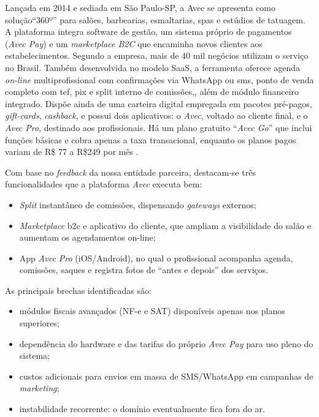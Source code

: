 Lançada em 2014 e sediada em São Paulo-SP, a Avec se apresenta como solução``360º'' para salões, barbearias, esmaltarias, spas e estúdios de tatuagem. A plataforma integra software de gestão, um sistema próprio de pagamentos (\emph{Avec Pay}) e um \emph{marketplace B2C} que encaminha novos clientes aos estabelecimentos. Segundo a empresa, mais de 40 mil negócios utilizam o serviço no
Brasil. Também desenvolvida no modelo SaaS, a ferramenta oferece agenda \emph{on-line} multiprofissional com confirmações via WhatsApp ou \gls{sms}, ponto de venda completo com \gls{tef}, \gls{pix} e split interno de comissões,, além de módulo financeiro integrado. Dispõe ainda de uma carteira digital empregada em pacotes pré-pagos, \emph{gift-cards}, \emph{cashback}, e possui dois aplicativos: o \emph{Avec}, voltado ao cliente final, e o \emph{Avec Pro}, destinado aos profissionais. Há um plano gratuito ``\emph{Avec Go}'' que inclui funções básicas e cobra apenas a taxa transacional, enquanto os planos pagos variam de R\$ 77 a
R\$249 por mês \cite{Avec}.


Com base no \emph{feedback} da nossa entidade parceira, destacam-se três funcionalidades que
a plataforma \emph{Avec} executa bem:
\begin{itemize}
	\item \emph{Split} instantâneo de comissões, dispensando \emph{gateways} externos;
	\item \emph{Marketplace} \gls{b2c} e aplicativo do cliente, que ampliam a visibilidade do salão e aumentam os agendamentos on-line;
	\item App \emph{Avec Pro} (iOS/Android), no qual o profissional acompanha agenda,
	comissões, saques e registra fotos de “antes e depois” dos serviços.
\end{itemize}

As principais brechas identificadas são:
\begin{itemize}
	\item módulos fiscais avançados (NF-e e SAT) disponíveis apenas nos planos superiores;
	\item dependência do hardware e das tarifas do próprio \emph{Avec Pay} para uso pleno do sistema;
	\item custos adicionais para envios em massa de SMS/WhatsApp em campanhas de \emph{marketing};
	\item instabilidade recorrente: o domínio eventualmente fica fora do ar.
\end{itemize}


